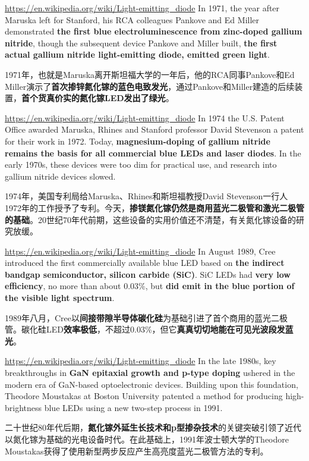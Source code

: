 \documentclass{beamer}
\newenvironment{slide}{
    \begin{frame}{\bfseries{\sectiontitle}}
}{
    \end{frame}
}
\begin{document}
\begin{slide}{\url{https://en.wikipedia.org/wiki/Light-emitting_diode}}
    In 1971, the year after Maruska left for Stanford, his RCA colleagues Pankove and Ed Miller demonstrated \textbf{the first blue electroluminescence from zinc-doped gallium nitride}, though the subsequent device Pankove and Miller built, \textbf{the first actual gallium nitride light-emitting diode, emitted green light}.
    \bigskip

    1971年，也就是Maruska离开斯坦福大学的一年后，他的RCA同事Pankove和Ed Miller演示了\textbf{首次掺锌氮化镓的蓝色电致发光}，通过Pankove和Miller建造的后续装置，\textbf{首个货真价实的氮化镓LED发出了绿光}。
\end{slide}

\begin{slide}{\url{https://en.wikipedia.org/wiki/Light-emitting_diode}}
    In 1974 the U.S. Patent Office awarded Maruska, Rhines and Stanford professor David Stevenson a patent for their work in 1972. Today, \textbf{magnesium-doping of gallium nitride remains the basis for all commercial blue LEDs and laser diodes}. In the early 1970s, these devices were too dim for practical use, and research into gallium nitride devices slowed.
    \bigskip

    1974年，美国专利局给Maruska、Rhines和斯坦福教授David Stevenson一行人1972年的工作授予了专利。今天，\textbf{掺镁氮化镓仍然是商用蓝光二极管和激光二极管的基础}。20世纪70年代前期，这些设备的实用价值还不清楚，有关氮化镓设备的研究放缓。
\end{slide}

\begin{slide}{\url{https://en.wikipedia.org/wiki/Light-emitting_diode}}
    In August 1989, Cree introduced the first commercially available blue LED based on \textbf{the indirect bandgap semiconductor, silicon carbide (SiC)}. SiC LEDs had \textbf{very low efficiency}, no more than about 0.03\%, but \textbf{did emit in the blue portion of the visible light spectrum}.
    \bigskip

    1989年八月，Cree以\textbf{间接带隙半导体碳化硅}为基础引进了首个商用的蓝光二极管。碳化硅LED\textbf{效率极低}，不超过0.03\%，但它\textbf{真真切切地能在可见光波段发蓝光}。
\end{slide}

\begin{slide}{\url{https://en.wikipedia.org/wiki/Light-emitting_diode}}
    In the late 1980s, key breakthroughs in \textbf{GaN epitaxial growth and p-type doping} ushered in the modern era of GaN-based optoelectronic devices. Building upon this foundation, Theodore Moustakas at Boston University patented a method for producing high-brightness blue LEDs using a new two-step process in 1991.
    \bigskip

    二十世纪80年代后期，\textbf{氮化镓外延生长技术和p型掺杂技术}的关键突破引领了近代以氮化镓为基础的光电设备时代。在此基础上，1991年波士顿大学的Theodore Moustakas获得了使用新型两步反应产生高亮度蓝光二极管方法的专利。
\end{slide}
\end{document}

